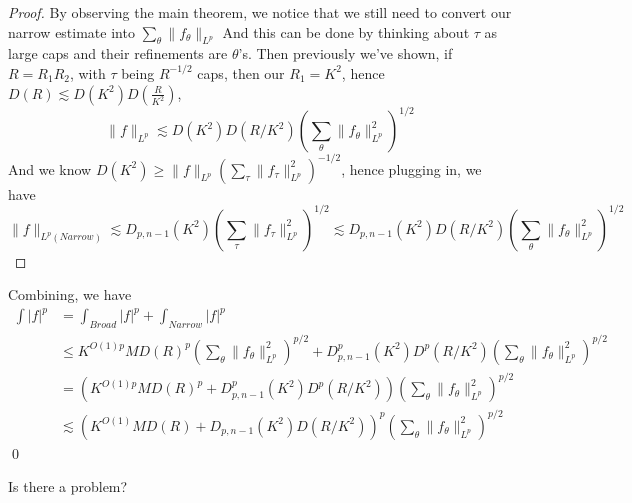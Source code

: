 \begin{proof}
    By observing the main theorem, we notice that we still need to convert our narrow estimate into $\sum_\theta\|f_\theta\|_{L^p}$
    And this can be done by thinking about $\tau$ as large caps and their refinements are $\theta$'s. Then previously we've shown, if $R=R_1R_2$, with $\tau$ being $R^{-1/2}$ caps, then our $R_1=K^2$, hence $D(R)\lesssim D(K^2)D(\frac{R}{K^2})$,
    \begin{equation*}
        \|f\|_{L^p}\lesssim D(K^2)D(R/K^2)\left(\sum_\theta\|f_\theta\|_{L^p}^2 \right)^{1/2}
    \end{equation*}
    And we know $D(K^2)\geq\|f\|_{L^p}\left(\sum_\tau\|f_\tau\|_{L^p}^2 \right)^{-1/2}$, hence plugging in, we have
    \begin{equation*}
        \|f\|_{L^p(Narrow)}\lesssim D_{p,n-1}(K^2)\left(\sum_\tau\|f_\tau\|_{L^p}^2 \right)^{1/2}\lesssim D_{p,n-1}(K^2)D(R/K^2)\left(\sum_\theta\|f_\theta\|_{L^p}^2 \right)^{1/2}
    \end{equation*}
\end{proof}
    Combining, we have
    \begin{align*}
        \int|f|^p&=\int_{Broad}|f|^p+\int_{Narrow}|f|^p\\
        &\leq K^{O(1)p}MD(R)^p\left(\sum_\theta\|f_\theta\|_{L^p}^2 \right)^{p/2}+D_{p,n-1}^p(K^2)D^p(R/K^2)\left(\sum_\theta\|f_\theta\|_{L^p}^2 \right)^{p/2}\\
        &=\left(K^{O(1)p}MD(R)^p+D_{p,n-1}^p(K^2)D^p(R/K^2)\right)\left(\sum_\theta\|f_\theta\|_{L^p}^2 \right)^{p/2}\\
        &\lesssim \left(K^{O(1)}MD(R)+D_{p,n-1}(K^2)D(R/K^2)\right)^p\left(\sum_\theta\|f_\theta\|_{L^p}^2 \right)^{p/2}
    \end{align*}
\qed

Is there a problem?
